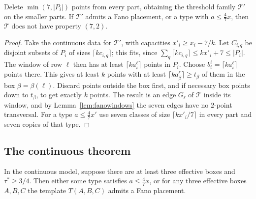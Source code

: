 \begin{lemma}[realisation]\label{lem:realise}
Delete $\min(7,|P_i|)$ points from every part, obtaining the threshold family $\mathcal T'$ on the smaller parts. If $\mathcal T'$ admits a Fano placement, or a type with $a\le\tfrac47x$, then $\mathcal T$ does not have property $(7,2)$.
\end{lemma}

\begin{proof}
Take the continuous data for $\mathcal T'$, with capacities $x'_i\ge x_i-7/k$. Let $C_{i,q}$ be disjoint subsets of $P_i$ of sizes $\lceil kc_{i,q}\rceil$; this fits, since $\sum_q\lceil kc_{i,q}\rceil\le kx'_i+7\le|P_i|$. The window of row $\ell$ then has at least $\lceil ka^\ell_i\rceil$ points in $P_i$. Choose $b^\ell_i=\lceil ka^\ell_i\rceil$ points there. This gives at least $k$ points with at least $\lceil ka^\ell_{\beta}\rceil\ge t_\beta$ of them in the box $\beta=\beta(\ell)$. Discard points outside the box first, and if necessary box points down to $t_\beta$, to get exactly $k$ points. The result is an edge $G_\ell$ of $\mathcal T$ inside its window, and by Lemma~\ref{lem:fanowindows} the seven edges have no $2$-point transversal. For a type $a\le\frac47x'$ use seven classes of size $\lceil kx'_i/7\rceil$ in every part and seven copies of that type.
\end{proof}

\subsection{The continuous theorem}

\begin{theorem}\label{thm:threshold-cont}
In the continuous model, suppose there are at least three effective boxes and $\tau^*\ge 3/4$. Then either some type satisfies $a\le\frac47x$, or for any three effective boxes $A,B,C$ the template $T(A,B,C)$ admits a Fano placement.
\end{theorem}

